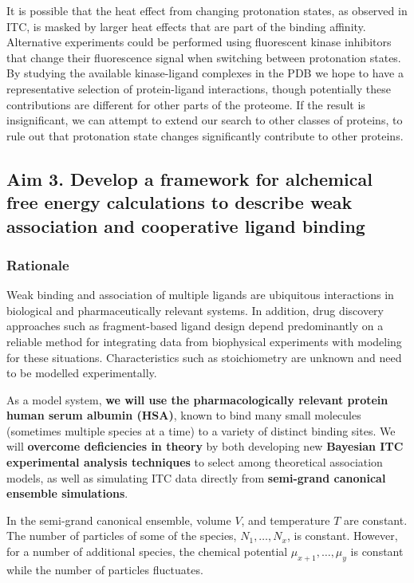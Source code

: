 \documentclass[10pt,final]{article}
\begin{document}
It is possible that the heat effect from changing protonation states, as observed in ITC, is masked by larger heat effects that are part of the binding affinity. Alternative experiments could be performed using fluorescent kinase inhibitors that change their fluorescence signal when switching between protonation states.
By studying the available kinase-ligand complexes in the PDB we hope to have a representative selection of protein-ligand interactions, though potentially these contributions are different for other parts of the proteome. If the result is insignificant, we can attempt to extend our search to other classes of proteins, to rule out that protonation state changes significantly contribute to other proteins.


\subsection*{Aim 3. Develop a framework for alchemical free energy calculations to describe weak association and cooperative ligand binding}
\subsubsection*{Rationale}
Weak binding and association of multiple ligands are ubiquitous interactions in biological and pharmaceutically relevant systems.
In addition, drug discovery approaches such as fragment-based ligand design depend predominantly on a reliable method for integrating data from biophysical experiments with modeling for these situations. Characteristics such as stoichiometry are unknown and need to be modelled experimentally.

As a model system, \textbf{we will use the pharmacologically relevant protein human serum albumin (HSA)}, known to bind many small molecules (sometimes multiple species at a time) to a variety of distinct binding sites.
We will \textbf{overcome deficiencies in theory} by both developing new \textbf{Bayesian ITC experimental analysis techniques} to select among theoretical association models, as well as simulating ITC data directly from \textbf{semi-grand canonical ensemble simulations}.

In the semi-grand canonical ensemble,  volume $V$, and temperature $T$ are constant. The number of particles of some of the species, $N_1,\dots,N_x$, is constant. However, for a number of additional species, the chemical potential $\mu_{x+1},\dots,\mu_{y}$ is constant while the number of particles fluctuates.
\end{document}
